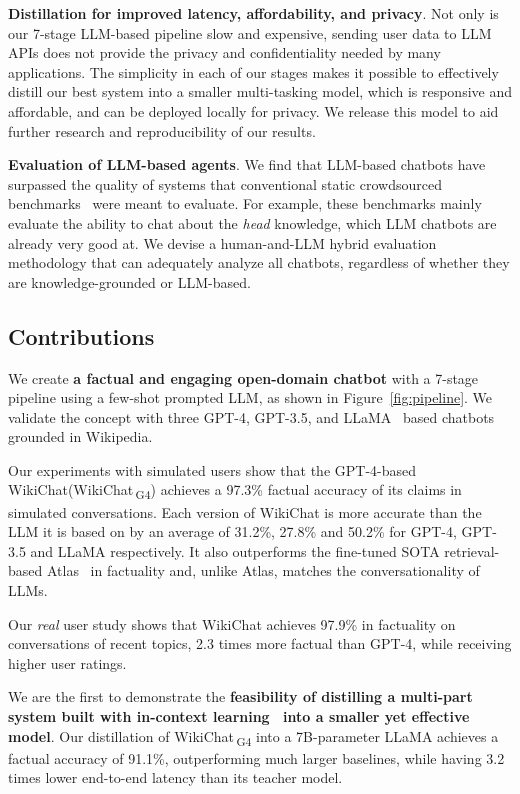 \documentclass[11pt]{article}
\newcommand{\system}[0]{WikiChat\xspace}
\newcommand{\systemgf}[0]{WikiChat$\,$\textsubscript{G4}\xspace}
\begin{document}
{\bf Distillation for improved latency, affordability, and privacy}. 
Not only is our 7-stage LLM-based pipeline slow and expensive, sending user data to LLM APIs does not provide the privacy and confidentiality needed by many applications. The simplicity in each of our stages makes it possible to effectively distill our best system into a smaller multi-tasking model, which is responsive and affordable, and can be deployed locally for privacy. We release this model to aid further research and reproducibility of our results.

{\bf Evaluation of LLM-based agents}. 
We find that LLM-based chatbots have surpassed the quality of systems that  
conventional static crowdsourced benchmarks~\cite{dinan2019wizard, komeili-etal-2022-internet} were meant to evaluate. For example, these benchmarks mainly evaluate the ability to chat about the \emph{head} knowledge, which LLM chatbots are already very good at. We devise a human-and-LLM hybrid evaluation methodology that can adequately analyze all chatbots, regardless of whether they are knowledge-grounded or LLM-based.

\subsection{Contributions}
We create {\bf a factual and engaging open-domain chatbot} with a 7-stage pipeline using a few-shot prompted LLM, as shown in Figure~\ref{fig:pipeline}.
    We validate the concept with three GPT-4, GPT-3.5, and LLaMA~\cite{touvron2023llama} based chatbots grounded in Wikipedia.
    
    Our experiments with simulated users show that the GPT-4-based \system (\systemgf) achieves a 97.3\% factual accuracy of its claims in simulated conversations. Each version of \system is more accurate than the LLM it is based on by an average of 31.2\%, 27.8\% and 50.2\% for GPT-4, GPT-3.5 and LLaMA respectively.   
    It also outperforms the fine-tuned SOTA retrieval-based Atlas~\cite{izacard2022atlas} in factuality and, unlike Atlas, matches the conversationality of LLMs. 
    
Our {\em real} user study shows that WikiChat achieves 97.9\% in factuality on conversations of recent topics, 
2.3 times more factual than GPT-4, while receiving  higher user ratings.

We are the first to demonstrate the {\bf feasibility of distilling a multi-part system built with in-context learning~\cite{brown2020language} into a smaller yet effective model}. Our distillation of \systemgf into a 7B-parameter LLaMA achieves a factual accuracy of 91.1\%, outperforming much larger baselines, while having 3.2 times lower end-to-end latency than its teacher model.
\end{document}
